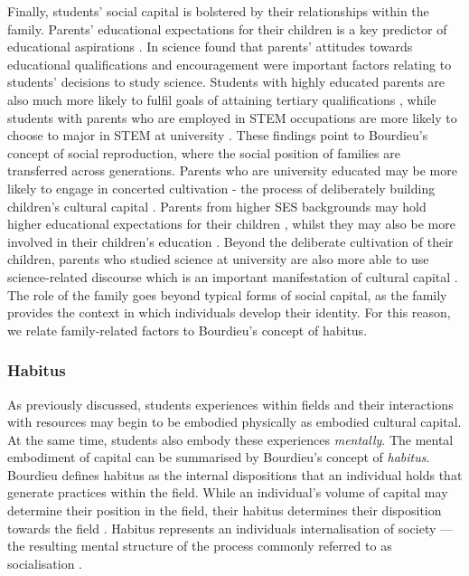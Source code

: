 Finally, students' social capital is bolstered by their relationships within the family. Parents' educational expectations for their children is a key predictor of educational aspirations \cite{wu2015early}. In science \cite{Lyons_2006} found that parents' attitudes towards educational qualifications and encouragement were important factors relating to students' decisions to study science. Students with highly educated parents are also much more likely to fulfil goals of attaining tertiary qualifications \cite{reynolds2011change}, while students with parents who are employed in STEM occupations are more likely to choose to major in STEM at university \cite{moakler2014college}. These findings point to Bourdieu's concept of social reproduction, where the social position of families are transferred across generations. Parents who are university educated may be more likely to engage in concerted cultivation - the process of deliberately building children's cultural capital \cite{lareau2011unequal}. Parents from higher SES backgrounds may hold higher educational expectations for their children \cite{carolan2015does}, whilst they may also be more involved in their children's education \cite{cheadle2011quantitative}. Beyond the deliberate cultivation of their children, parents who studied science at university are also more able to use science-related discourse which is an important manifestation of cultural capital \cite{Lyons_2006, bernstein1971class}. The role of the family goes beyond typical forms of social capital, as the family provides the context in which individuals develop their identity. For this reason, we relate family-related factors to Bourdieu's concept of habitus. 

\subsubsection*{Habitus}
As previously discussed, students experiences within fields and their interactions with resources may begin to be embodied physically as embodied cultural capital. At the same time, students also embody these experiences \textit{mentally}. The mental embodiment of capital can be summarised by Bourdieu's concept  of \textit{habitus}. Bourdieu defines habitus as the internal dispositions that an individual holds that generate practices within the field. While an individual's volume of capital may determine their position in the field, their habitus determines their disposition towards the field \cite{bourdieu1992invitation}. Habitus represents an individuals internalisation of society --- the resulting mental structure of the process commonly referred to as socialisation \cite{Nash1999}.

